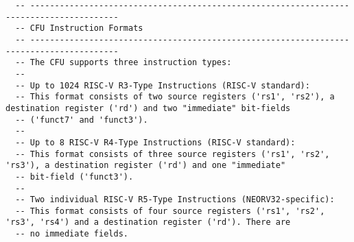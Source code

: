 \begin{code}
\begin{verbatim}
  -- ----------------------------------------------------------------------------------------
  -- CFU Instruction Formats
  -- ----------------------------------------------------------------------------------------
  -- The CFU supports three instruction types:
  --
  -- Up to 1024 RISC-V R3-Type Instructions (RISC-V standard):
  -- This format consists of two source registers ('rs1', 'rs2'), a destination register ('rd') and two "immediate" bit-fields
  -- ('funct7' and 'funct3').
  --
  -- Up to 8 RISC-V R4-Type Instructions (RISC-V standard):
  -- This format consists of three source registers ('rs1', 'rs2', 'rs3'), a destination register ('rd') and one "immediate"
  -- bit-field ('funct3').
  --
  -- Two individual RISC-V R5-Type Instructions (NEORV32-specific):
  -- This format consists of four source registers ('rs1', 'rs2', 'rs3', 'rs4') and a destination register ('rd'). There are
  -- no immediate fields.


\end{verbatim}
\end{code}
